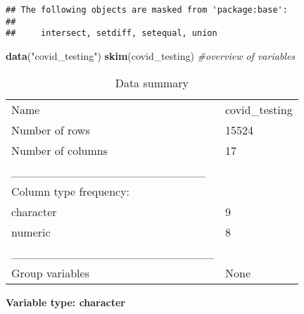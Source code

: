 \documentclass[
]{article}
\newenvironment{Shaded}{\begin{snugshade}}{\end{snugshade}}
\newcommand{\CommentTok}[1]{\textcolor[rgb]{0.56,0.35,0.01}{\textit{#1}}}
\newcommand{\FunctionTok}[1]{\textcolor[rgb]{0.13,0.29,0.53}{\textbf{#1}}}
\newcommand{\NormalTok}[1]{#1}
\newcommand{\StringTok}[1]{\textcolor[rgb]{0.31,0.60,0.02}{#1}}
\begin{document}
\begin{verbatim}
## The following objects are masked from 'package:base':
## 
##     intersect, setdiff, setequal, union
\end{verbatim}

\begin{Shaded}
\begin{Highlighting}[]
\FunctionTok{data}\NormalTok{(}\StringTok{"covid\_testing"}\NormalTok{)}
\FunctionTok{skim}\NormalTok{(covid\_testing) }\CommentTok{\#overview of variables}
\end{Highlighting}
\end{Shaded}

\begin{longtable}[]{@{}ll@{}}
\caption{Data summary}\tabularnewline
\toprule\noalign{}
\endfirsthead
\endhead
\bottomrule\noalign{}
\endlastfoot
Name & covid\_testing \\
Number of rows & 15524 \\
Number of columns & 17 \\
\_\_\_\_\_\_\_\_\_\_\_\_\_\_\_\_\_\_\_\_\_\_\_ & \\
Column type frequency: & \\
character & 9 \\
numeric & 8 \\
\_\_\_\_\_\_\_\_\_\_\_\_\_\_\_\_\_\_\_\_\_\_\_\_ & \\
Group variables & None \\
\end{longtable}

\textbf{Variable type: character}
\end{document}
